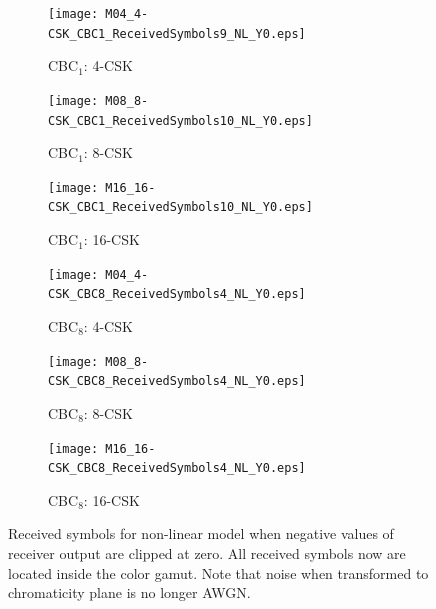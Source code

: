 \documentclass[10pt,letterpaper]{article}
\begin{document}
\begin{figure}[t]
	\centering
		\begin{subfigure}{0.32\textwidth}
		\centering
			\texttt{[image: M04\_4-CSK\_CBC1\_ReceivedSymbols9\_NL\_Y0.eps]}
			\caption{CBC$_{1}$: 4-CSK}
			\label{fig4RcvSym_NL1_Y0}
		\end{subfigure}
		\hfill
		\begin{subfigure}{0.32\textwidth}
		\centering
			\texttt{[image: M08\_8-CSK\_CBC1\_ReceivedSymbols10\_NL\_Y0.eps]}
			\caption{CBC$_{1}$: 8-CSK}
			\label{fig8RcvSym_NL1_Y0}
		\end{subfigure}
		\hfill
		\begin{subfigure}{0.32\textwidth}
		\centering
			\texttt{[image: M16\_16-CSK\_CBC1\_ReceivedSymbols10\_NL\_Y0.eps]}
			\caption{CBC$_{1}$: 16-CSK}
			\label{fig16RcvSym_NL1_Y0}
		\end{subfigure}
		\vfill
		\begin{subfigure}{0.32\textwidth}
		\centering
			\texttt{[image: M04\_4-CSK\_CBC8\_ReceivedSymbols4\_NL\_Y0.eps]}
			\caption{CBC$_{8}$: 4-CSK}
			\label{fig4RcvSym_NL8_Y0}
		\end{subfigure}
		\hfill
		\begin{subfigure}{0.32\textwidth}
		\centering
			\texttt{[image: M08\_8-CSK\_CBC8\_ReceivedSymbols4\_NL\_Y0.eps]}
			\caption{CBC$_{8}$: 8-CSK}
			\label{fig8RcvSym_NL8_Y0}
		\end{subfigure}
		\hfill
		\begin{subfigure}{0.32\textwidth}
		\centering
			\texttt{[image: M16\_16-CSK\_CBC8\_ReceivedSymbols4\_NL\_Y0.eps]}
			\caption{CBC$_{8}$: 16-CSK}
			\label{fig16RcvSym_NL8_Y0}
		\end{subfigure}
	\caption{Received symbols for non-linear model when negative values of receiver output are clipped at zero. All received symbols now are located inside the color gamut. Note that noise when transformed to chromaticity plane is no longer AWGN.}
	\label{figRcvSym_NL_Y0}
\end{figure}
\end{document}
